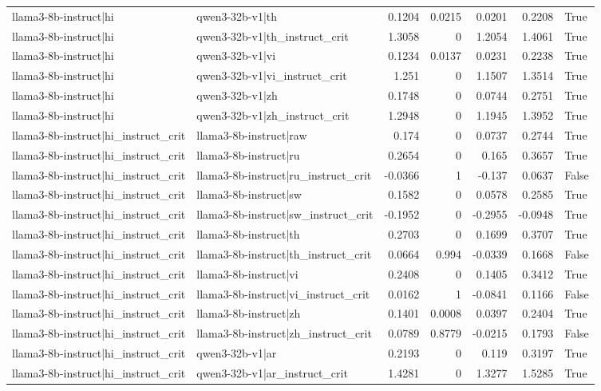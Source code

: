 \begin{table}
\begin{tabular}{l l r r r r l}
llama3-8b-instruct|hi & qwen3-32b-v1|th & 0.1204 & 0.0215 & 0.0201 & 0.2208 & True \\
llama3-8b-instruct|hi & qwen3-32b-v1|th_instruct_crit & 1.3058 & 0 & 1.2054 & 1.4061 & True \\
llama3-8b-instruct|hi & qwen3-32b-v1|vi & 0.1234 & 0.0137 & 0.0231 & 0.2238 & True \\
llama3-8b-instruct|hi & qwen3-32b-v1|vi_instruct_crit & 1.251 & 0 & 1.1507 & 1.3514 & True \\
llama3-8b-instruct|hi & qwen3-32b-v1|zh & 0.1748 & 0 & 0.0744 & 0.2751 & True \\
llama3-8b-instruct|hi & qwen3-32b-v1|zh_instruct_crit & 1.2948 & 0 & 1.1945 & 1.3952 & True \\
llama3-8b-instruct|hi_instruct_crit & llama3-8b-instruct|raw & 0.174 & 0 & 0.0737 & 0.2744 & True \\
llama3-8b-instruct|hi_instruct_crit & llama3-8b-instruct|ru & 0.2654 & 0 & 0.165 & 0.3657 & True \\
llama3-8b-instruct|hi_instruct_crit & llama3-8b-instruct|ru_instruct_crit & -0.0366 & 1 & -0.137 & 0.0637 & False \\
llama3-8b-instruct|hi_instruct_crit & llama3-8b-instruct|sw & 0.1582 & 0 & 0.0578 & 0.2585 & True \\
llama3-8b-instruct|hi_instruct_crit & llama3-8b-instruct|sw_instruct_crit & -0.1952 & 0 & -0.2955 & -0.0948 & True \\
llama3-8b-instruct|hi_instruct_crit & llama3-8b-instruct|th & 0.2703 & 0 & 0.1699 & 0.3707 & True \\
llama3-8b-instruct|hi_instruct_crit & llama3-8b-instruct|th_instruct_crit & 0.0664 & 0.994 & -0.0339 & 0.1668 & False \\
llama3-8b-instruct|hi_instruct_crit & llama3-8b-instruct|vi & 0.2408 & 0 & 0.1405 & 0.3412 & True \\
llama3-8b-instruct|hi_instruct_crit & llama3-8b-instruct|vi_instruct_crit & 0.0162 & 1 & -0.0841 & 0.1166 & False \\
llama3-8b-instruct|hi_instruct_crit & llama3-8b-instruct|zh & 0.1401 & 0.0008 & 0.0397 & 0.2404 & True \\
llama3-8b-instruct|hi_instruct_crit & llama3-8b-instruct|zh_instruct_crit & 0.0789 & 0.8779 & -0.0215 & 0.1793 & False \\
llama3-8b-instruct|hi_instruct_crit & qwen3-32b-v1|ar & 0.2193 & 0 & 0.119 & 0.3197 & True \\
llama3-8b-instruct|hi_instruct_crit & qwen3-32b-v1|ar_instruct_crit & 1.4281 & 0 & 1.3277 & 1.5285 & True \\

\end{tabular}
\end{table}
